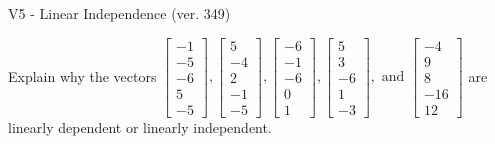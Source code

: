 \begin{exercise}
  \begin{exerciseTitle}V5 - Linear Independence (ver. 349)\end{exerciseTitle}
  \begin{exerciseStatement}
    Explain why the vectors \(\left[\begin{array}{r}
-1 \\
-5 \\
-6 \\
5 \\
-5
\end{array}\right] , \left[\begin{array}{r}
5 \\
-4 \\
2 \\
-1 \\
-5
\end{array}\right] , \left[\begin{array}{r}
-6 \\
-1 \\
-6 \\
0 \\
1
\end{array}\right] , \left[\begin{array}{r}
5 \\
3 \\
-6 \\
1 \\
-3
\end{array}\right] , \text{ and } \left[\begin{array}{r}
-4 \\
9 \\
8 \\
-16 \\
12
\end{array}\right]\) are linearly dependent or linearly independent.	



\end{exerciseStatement}
\end{exercise}
